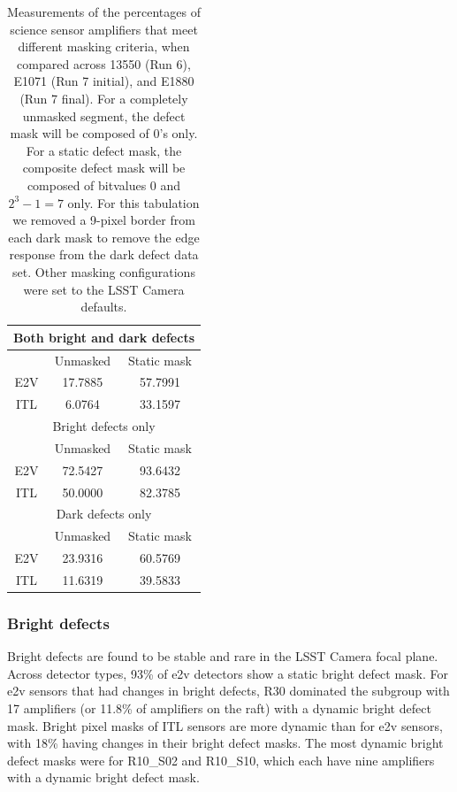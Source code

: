 \begin{table}[ht]\label{table:defectStability:measurements}
\centering
\begin{tabular}{|ccc|}
\hline
\multicolumn{3}{|c|}{Both bright and dark defects}                      \\ \hline
\multicolumn{1}{|c|}{}    & \multicolumn{1}{c|}{Unmasked} & Static mask \\ \hline
\multicolumn{1}{|c|}{E2V} & \multicolumn{1}{c|}{17.7885}  & 57.7991     \\ \hline
\multicolumn{1}{|c|}{ITL} & \multicolumn{1}{c|}{6.0764}   & 33.1597     \\ \hline
\multicolumn{3}{|c|}{Bright defects only}                               \\ \hline
\multicolumn{1}{|c|}{}    & \multicolumn{1}{c|}{Unmasked} & Static mask \\ \hline
\multicolumn{1}{|c|}{E2V} & \multicolumn{1}{c|}{72.5427}  & 93.6432     \\ \hline
\multicolumn{1}{|c|}{ITL} & \multicolumn{1}{c|}{50.0000}  & 82.3785     \\ \hline
\multicolumn{3}{|c|}{Dark defects only}                                 \\ \hline
\multicolumn{1}{|c|}{}    & \multicolumn{1}{c|}{Unmasked} & Static mask \\ \hline
\multicolumn{1}{|c|}{E2V} & \multicolumn{1}{c|}{23.9316}  & 60.5769     \\ \hline
\multicolumn{1}{|c|}{ITL} & \multicolumn{1}{c|}{11.6319}  & 39.5833     \\ \hline
\end{tabular}
\caption{Measurements of the percentages of science sensor amplifiers that meet different masking criteria, when compared across 13550 (Run 6), E1071 (Run 7 initial), and E1880 (Run 7 final). For a completely unmasked segment, the defect mask will be composed of 0's only. For a static defect mask, the composite defect mask will be composed of bitvalues 0 and $2^3-1=7$ only. For this tabulation we removed a 9-pixel border from each dark mask to remove the edge response from the dark defect data set. Other masking configurations were set to the LSST Camera defaults.}
\end{table}

\subsubsection{Bright defects}

Bright defects are found to be stable and rare in the LSST Camera focal plane. Across detector types, 93\% of e2v detectors show a static bright defect mask. For e2v sensors that had changes in bright defects, R30 dominated the subgroup with 17 amplifiers (or 11.8\% of amplifiers on the raft) with a dynamic bright defect mask. Bright pixel masks of ITL sensors are more dynamic than for e2v sensors, with 18\% having changes in their bright defect masks. The most dynamic bright defect masks were for R10\_S02 and R10\_S10, which each have nine amplifiers with a dynamic bright defect mask.


